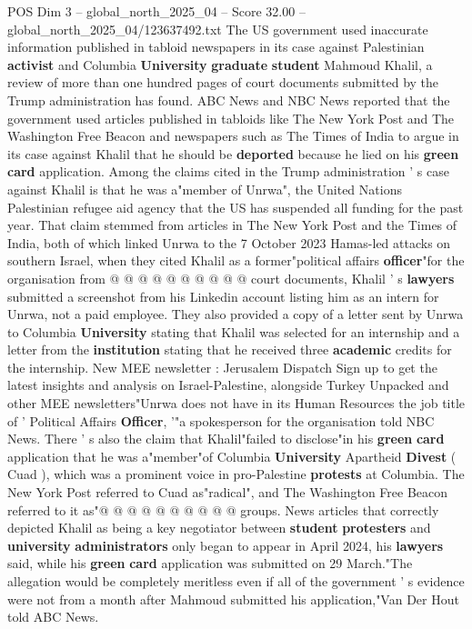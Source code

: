 \begin{textsample}{POS Dim 3 – global\_north\_2025\_04 – Score 32.00 – global\_north\_2025\_04/123637492.txt}  \label{ex:f3_pos_053}
The US government used inaccurate information published in tabloid newspapers in its case against Palestinian \textbf{activist} and Columbia \textbf{University} \textbf{graduate} \textbf{student} Mahmoud Khalil, a review of more than one hundred pages of court documents submitted by the Trump administration has found.
ABC News and NBC News reported that the government used articles published in tabloids like The New York Post and The Washington Free Beacon and newspapers such as The Times of India to argue in its case against Khalil that he should be \textbf{deported} because he lied on his \textbf{green} \textbf{card} application.
Among the claims cited in the Trump administration ' s case against Khalil is that he was a"member of Unrwa", the United Nations Palestinian refugee aid agency that the US has suspended all funding for the past year.
That claim stemmed from articles in The New York Post and the Times of India, both of which linked Unrwa to the 7 October 2023 Hamas-led attacks on southern Israel, when they cited Khalil as a former"political affairs \textbf{officer}"for the organisation from @ @ @ @ @ @ @ @ @ @ court documents, Khalil ' s \textbf{lawyers} submitted a screenshot from his Linkedin account listing him as an intern for Unrwa, not a paid employee.
They also provided a copy of a letter sent by Unrwa to Columbia \textbf{University} stating that Khalil was selected for an internship and a letter from the \textbf{institution} stating that he received three \textbf{academic} credits for the internship.
New MEE newsletter : Jerusalem Dispatch Sign up to get the latest insights and analysis on Israel-Palestine, alongside Turkey Unpacked and other MEE newsletters"Unrwa does not have in its Human Resources the job title of ' Political Affairs \textbf{Officer}, '"a spokesperson for the organisation told NBC News.
There ' s also the claim that Khalil"failed to disclose"in his \textbf{green} \textbf{card} application that he was a"member"of Columbia \textbf{University} Apartheid \textbf{Divest} ( Cuad ), which was a prominent voice in pro-Palestine \textbf{protests} at Columbia.
The New York Post referred to Cuad as"radical", and The Washington Free Beacon referred to it as"@ @ @ @ @ @ @ @ @ @ groups.
News articles that correctly depicted Khalil as being a key negotiator between \textbf{student} \textbf{protesters} and \textbf{university} \textbf{administrators} only began to appear in April 2024, his \textbf{lawyers} said, while his \textbf{green} \textbf{card} application was submitted on 29 March."The allegation would be completely meritless even if all of the government ' s evidence were not from a month after Mahmoud submitted his application,"Van Der Hout told ABC News.

\end{textsample}
